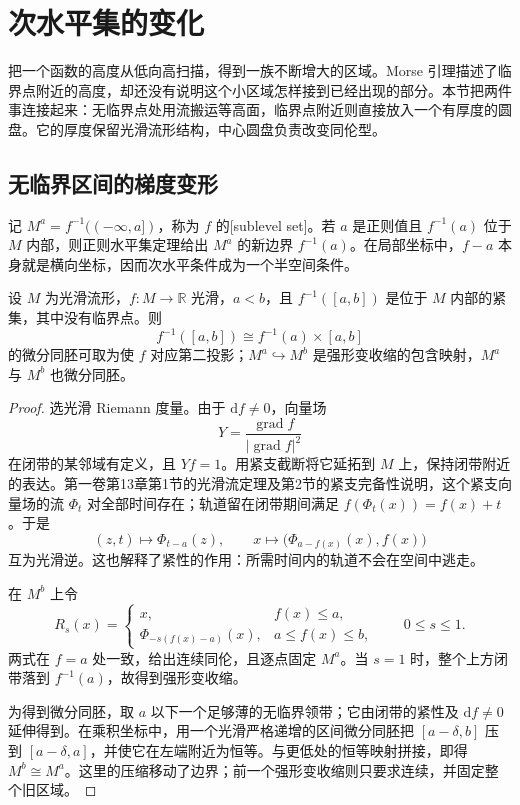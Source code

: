 
% 
% 

\section{次水平集的变化}
\label{g2:sec:1702}

把一个函数的高度从低向高扫描，得到一族不断增大的区域。Morse 引理描述了临界点附近的高度，却还没有说明这个小区域怎样接到已经出现的部分。本节把两件事连接起来：无临界点处用流搬运等高面，临界点附近则直接放入一个有厚度的圆盘。它的厚度保留光滑流形结构，中心圆盘负责改变同伦型。

\subsection{无临界区间的梯度变形}
\label{g2:subsec:1702:01}
记 \(M^a=f^{-1}(( -\infty,a])\)，称为 \(f\) 的[sublevel set]。若 \(a\) 是正则值且 \(f^{-1}(a)\) 位于 \(M\) 内部，则正则水平集定理给出 \(M^a\) 的新边界 \(f^{-1}(a)\)。在局部坐标中，\(f-a\) 本身就是横向坐标，因而次水平条件成为一个半空间条件。

\begin{proposition}\label{g2:prop:morse-regular-band}
	设 \(M\) 为光滑流形，\(f:M\to\mathbb R\) 光滑，\(a<b\)，且 \(f^{-1}([a,b])\) 是位于 \(M\) 内部的紧集，其中没有临界点。则
	\[
		f^{-1}([a,b])\cong f^{-1}(a)\times[a,b]
	\]
	的微分同胚可取为使 \(f\) 对应第二投影；\(M^a\hookrightarrow M^b\) 是强形变收缩的包含映射，\(M^a\) 与 \(M^b\) 也微分同胚。
\end{proposition}
\begin{proof}
	选光滑 Riemann 度量。由于 \(\mathrm{d}f\ne0\)，向量场
	\[
		Y=\frac{\operatorname{grad}f}{|\operatorname{grad}f|^2}
	\]
	在闭带的某邻域有定义，且 \(Yf=1\)。用紧支截断将它延拓到 \(M\) 上，保持闭带附近的表达。第一卷第13章第1节的光滑流定理及第2节的紧支完备性说明，这个紧支向量场的流 \(\Phi_t\) 对全部时间存在；轨道留在闭带期间满足 \(f(\Phi_t(x))=f(x)+t\)。于是
	\[
		(z,t)\longmapsto\Phi_{t-a}(z),\qquad
		x\longmapsto\bigl(\Phi_{a-f(x)}(x),f(x)\bigr)
	\]
	互为光滑逆。这也解释了紧性的作用：所需时间内的轨道不会在空间中逃走。

	在 \(M^b\) 上令
	\[
		R_s(x)=
		\begin{cases}
			x,&f(x)\le a,\\
			\Phi_{-s(f(x)-a)}(x),&a\le f(x)\le b,
		\end{cases}
		\qquad 0\le s\le1.
	\]
	两式在 \(f=a\) 处一致，给出连续同伦，且逐点固定 \(M^a\)。当 \(s=1\) 时，整个上方闭带落到 \(f^{-1}(a)\)，故得到强形变收缩。

	为得到微分同胚，取 \(a\) 以下一个足够薄的无临界领带；它由闭带的紧性及 \(\mathrm{d}f\ne0\) 延伸得到。在乘积坐标中，用一个光滑严格递增的区间微分同胚把 \([a-\delta,b]\) 压到 \([a-\delta,a]\)，并使它在左端附近为恒等。与更低处的恒等映射拼接，即得 \(M^b\cong M^a\)。这里的压缩移动了边界；前一个强形变收缩则只要求连续，并固定整个旧区域。
\end{proof}

